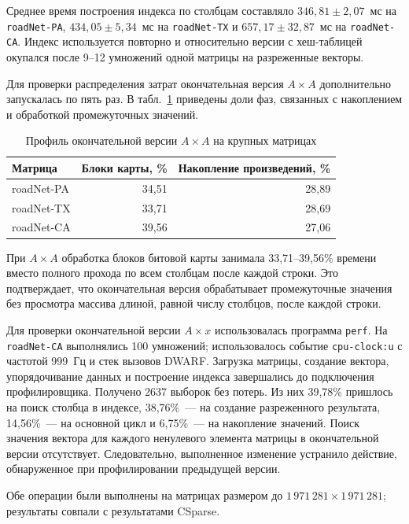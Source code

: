 \documentclass[a4paper]{article}
\begin{document}
Среднее время построения индекса по столбцам составляло $346{,}81 \pm 2{,}07$~мс на \texttt{roadNet-PA}, $434{,}05 \pm 5{,}34$~мс на \texttt{roadNet-TX} и $657{,}17 \pm 32{,}87$~мс на \texttt{roadNet-CA}. Индекс используется повторно и относительно версии с хеш-таблицей окупался после 9--12 умножений одной матрицы на разреженные векторы.

Для проверки распределения затрат окончательная версия $A\times A$ дополнительно запускалась по пять раз. В табл.~\ref{tab:large-profile} приведены доли фаз, связанных с накоплением и обработкой промежуточных значений.
\begin{table}[H]
\centering\small
\caption{Профиль окончательной версии $A\times A$ на крупных матрицах}
\label{tab:large-profile}
\begin{tabular}{lrr}
\toprule
Матрица & Блоки карты, \% & Накопление произведений, \%\\
\midrule
roadNet-PA & 34{,}51 & 28{,}89\\
roadNet-TX & 33{,}71 & 28{,}69\\
roadNet-CA & 39{,}56 & 27{,}06\\
\bottomrule
\end{tabular}
\end{table}

При $A\times A$ обработка блоков битовой карты занимала 33{,}71--39{,}56\% времени вместо полного прохода по всем столбцам после каждой строки. Это подтверждает, что окончательная версия обрабатывает промежуточные значения без просмотра массива длиной, равной числу столбцов, после каждой строки.

Для проверки окончательной версии $A\times x$ использовалась программа \texttt{perf}. На \texttt{roadNet-CA} выполнялись 100 умножений; использовалось событие \texttt{cpu-clock:u} с частотой 999~Гц и стек вызовов DWARF. Загрузка матрицы, создание вектора, упорядочивание данных и построение индекса завершались до подключения профилировщика. Получено 2637 выборок без потерь. Из них 39{,}78\% пришлось на поиск столбца в индексе, 38{,}76\%~--- на создание разреженного результата, 14{,}56\%~--- на основной цикл и 6{,}75\%~--- на накопление значений. Поиск значения вектора для каждого ненулевого элемента матрицы в окончательной версии отсутствует. Следовательно, выполненное изменение устранило действие, обнаруженное при профилировании предыдущей версии.

Обе операции были выполнены на матрицах размером до $1\,971\,281\times1\,971\,281$; результаты совпали с результатами CSparse.
\end{document}
